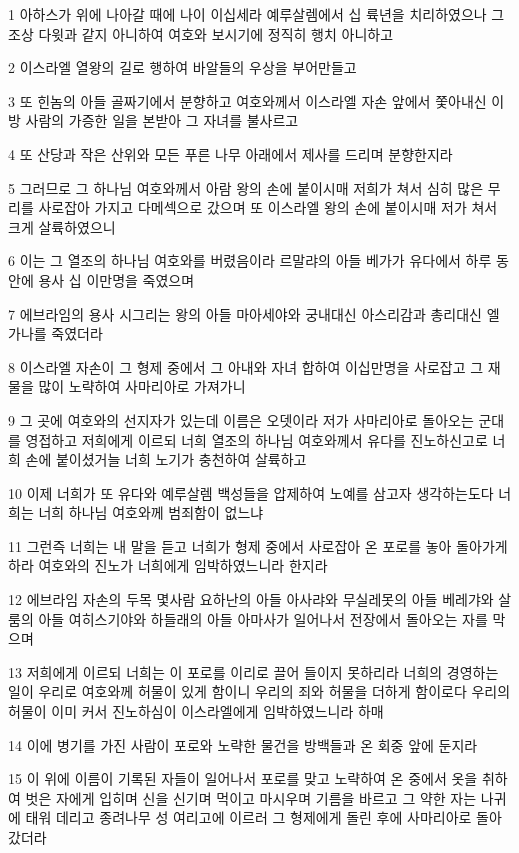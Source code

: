\par 1 아하스가 위에 나아갈 때에 나이 이십세라 예루살렘에서 십 륙년을 치리하였으나 그 조상 다윗과 같지 아니하여 여호와 보시기에 정직히 행치 아니하고
\par 2 이스라엘 열왕의 길로 행하여 바알들의 우상을 부어만들고
\par 3 또 힌놈의 아들 골짜기에서 분향하고 여호와께서 이스라엘 자손 앞에서 쫓아내신 이방 사람의 가증한 일을 본받아 그 자녀를 불사르고
\par 4 또 산당과 작은 산위와 모든 푸른 나무 아래에서 제사를 드리며 분향한지라
\par 5 그러므로 그 하나님 여호와께서 아람 왕의 손에 붙이시매 저희가 쳐서 심히 많은 무리를 사로잡아 가지고 다메섹으로 갔으며 또 이스라엘 왕의 손에 붙이시매 저가 쳐서 크게 살륙하였으니
\par 6 이는 그 열조의 하나님 여호와를 버렸음이라 르말랴의 아들 베가가 유다에서 하루 동안에 용사 십 이만명을 죽였으며
\par 7 에브라임의 용사 시그리는 왕의 아들 마아세야와 궁내대신 아스리감과 총리대신 엘가나를 죽였더라
\par 8 이스라엘 자손이 그 형제 중에서 그 아내와 자녀 합하여 이십만명을 사로잡고 그 재물을 많이 노략하여 사마리아로 가져가니
\par 9 그 곳에 여호와의 선지자가 있는데 이름은 오뎃이라 저가 사마리아로 돌아오는 군대를 영접하고 저희에게 이르되 너희 열조의 하나님 여호와께서 유다를 진노하신고로 너희 손에 붙이셨거늘 너희 노기가 충천하여 살륙하고
\par 10 이제 너희가 또 유다와 예루살렘 백성들을 압제하여 노예를 삼고자 생각하는도다 너희는 너희 하나님 여호와께 범죄함이 없느냐
\par 11 그런즉 너희는 내 말을 듣고 너희가 형제 중에서 사로잡아 온 포로를 놓아 돌아가게 하라 여호와의 진노가 너희에게 임박하였느니라 한지라
\par 12 에브라임 자손의 두목 몇사람 요하난의 아들 아사랴와 무실레못의 아들 베레갸와 살룸의 아들 여히스기야와 하들래의 아들 아마사가 일어나서 전장에서 돌아오는 자를 막으며
\par 13 저희에게 이르되 너희는 이 포로를 이리로 끌어 들이지 못하리라 너희의 경영하는 일이 우리로 여호와께 허물이 있게 함이니 우리의 죄와 허물을 더하게 함이로다 우리의 허물이 이미 커서 진노하심이 이스라엘에게 임박하였느니라 하매
\par 14 이에 병기를 가진 사람이 포로와 노략한 물건을 방백들과 온 회중 앞에 둔지라
\par 15 이 위에 이름이 기록된 자들이 일어나서 포로를 맞고 노략하여 온 중에서 옷을 취하여 벗은 자에게 입히며 신을 신기며 먹이고 마시우며 기름을 바르고 그 약한 자는 나귀에 태워 데리고 종려나무 성 여리고에 이르러 그 형제에게 돌린 후에 사마리아로 돌아 갔더라
